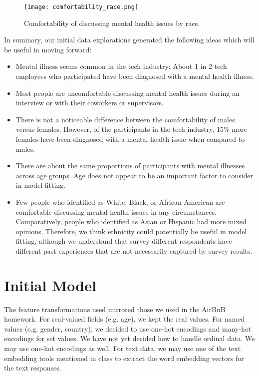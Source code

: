 \documentclass[times, twocolumn]{article}
\begin{document}
\begin{figure}
    \centering
    \texttt{[image: comfortability\_race.png]}
    \caption{Comfortability of discussing mental health issues by race.}
    \label{fig:comfortability_race}
\end{figure}


In summary, our initial data explorations generated the following ideas which will 
be useful in moving forward:

\begin{itemize}
    \item Mental illness seems common in the tech industry: About 1 in 2 tech 
    employees who participated have been diagnosed with a mental health illness. 

    \item Most people are uncomfortable discussing mental health issues during an 
    interview or with their coworkers or supervisors. 
    
    \item There is not a noticeable difference between the comfortability of males 
    versus females. However, of the participants in the tech industry, 15\% more 
    females have been diagnosed with a mental health issue when compared to males. 
    
    \item There are about the same proportions of participants with mental 
    illnesses across age groups. Age does not appear to be an important factor 
    to consider in model fitting. 
    
    \item Few people who identified as White, Black, or African American are 
    comfortable discussing mental health issues in any circumstances. 
    Comparatively, people who identified as Asian or Hispanic had more mixed 
    opinions. Therefore, we think ethnicity could potentially be useful in model 
    fitting, although we understand that survey different respondents have 
    different past experiences that are not necessarily captured by survey results.

\end{itemize}


\section{Initial Model}

The feature transformations used mirrored those we used in the AirBnB homework. 
For real-valued fields (e.g. age), we kept the real values. For named values 
(e.g. gender, country), we decided to use one-hot encodings and many-hot encodings 
for set values. We have not yet decided how to handle ordinal data. We may use 
one-hot encodings as well. For text data, we may use one of the text embedding 
tools mentioned in class to extract the word embedding vectors for the text responses. 
\end{document}
